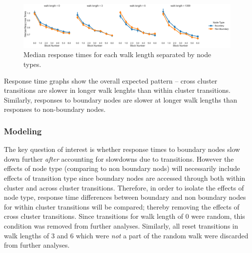 \begin{figure}
	\centering
	\includegraphics[width = \textwidth]{chapter_notebooks/chapter_2/figures/median_rts_nodetype.png}
	\caption{Median response times for each walk length separated by node types.}
	\label{fig:rt-walklength-nodes}
\end{figure}

Response time graphs show the overall expected pattern -- cross cluster transitions are slower in longer walk lenghts than within cluster transitions. Similarly, responses to boundary nodes are slower at longer walk lengths than responses to non-boundary nodes. 

\subsubsection*{Modeling}
The key question of interest is whether response times to boundary nodes slow down further \textit{after} accounting for slowdowns due to transitions. However the effects of node type (comparing to non boundary nods) will necessarily include effects of transition type since boundary nodes are accessed through both within cluster and across cluster transitions. Therefore, in order to isolate the effects of node type, response time differences between boundary and non boundary nodes for within cluster transitions will be compared; thereby removing the effects of cross cluster transitions. Since transitions for walk length of 0 were random, this condition was removed from further analyses. Similarly, all reset transitions in walk lengths of 3 and 6 which were \textit{not} a part of the random walk were discarded from further analyses.

